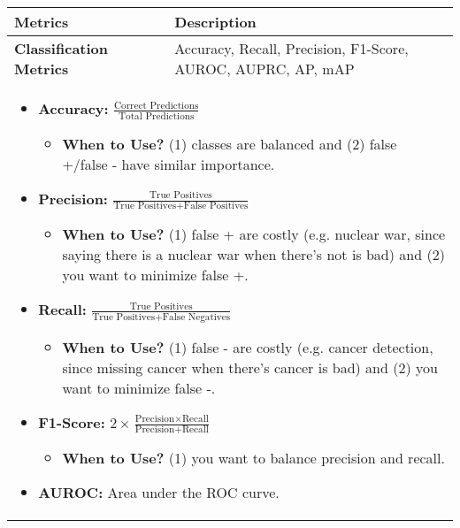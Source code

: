 \begin{summary}
    \begin{center}
        \begin{tabular}{ll}
        \toprule
        \textbf{Metrics} & \textbf{Description} \\
        \midrule
        \textbf{Classification Metrics} & Accuracy, Recall, Precision, F1-Score, AUROC, AUPRC, AP, mAP  \\
        \multicolumn{2}{p{\linewidth}}{
        \begin{itemize}
            \item \textbf{Accuracy:} $\frac{\text{Correct Predictions}}{\text{Total Predictions}}$
            \begin{itemize}
                \item \textbf{When to Use?} (1) classes are balanced and (2) false +/false - have similar importance.
            \end{itemize}
            \item \textbf{Precision:} $\frac{\text{True Positives}}{\text{True Positives} + \text{False Positives}}$
            \begin{itemize}
                \item \textbf{When to Use?} (1) false + are costly (e.g. nuclear war, since saying there is a nuclear war when there's not is bad) and (2) you want to minimize false +.
            \end{itemize}
            \item \textbf{Recall:} $\frac{\text{True Positives}}{\text{True Positives} + \text{False Negatives}}$
            \begin{itemize}
                \item \textbf{When to Use?} (1) false - are costly (e.g. cancer detection, since missing cancer when there's cancer is bad) and (2) you want to minimize false -.
            \end{itemize}
            \item \textbf{F1-Score:} $2 \times \frac{\text{Precision} \times \text{Recall}}{\text{Precision} + \text{Recall}}$
            \begin{itemize}
                \item \textbf{When to Use?} (1) you want to balance precision and recall.
            \end{itemize}
            \item \textbf{AUROC:} Area under the ROC curve. 
            \begin{itemize}

\end{itemize}
\end{itemize}}
\end{tabular}
\end{center}
\end{summary}

